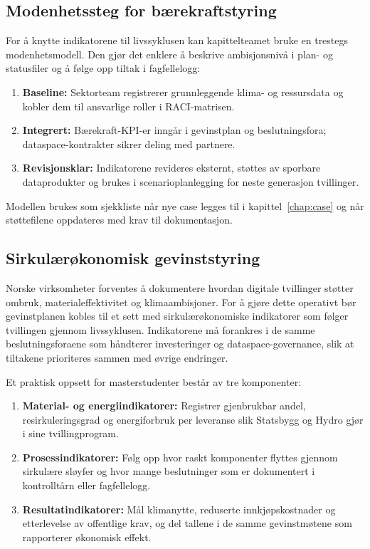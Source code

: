 \subsection*{Modenhetssteg for bærekraftstyring}
For å knytte indikatorene til livssyklusen kan kapittelteamet bruke en trestegs modenhetsmodell. Den gjør det enklere å beskrive ambisjonsnivå i plan- og statusfiler og å følge opp tiltak i fagfellelogg:
\begin{enumerate}
    \item \textbf{Baseline:} Sektorteam registrerer grunnleggende klima- og ressursdata og kobler dem til ansvarlige roller i RACI-matrisen.
    \item \textbf{Integrert:} Bærekraft-KPI-er inngår i gevinstplan og beslutningsfora; dataspace-kontrakter sikrer deling med partnere.
    \item \textbf{Revisjonsklar:} Indikatorene revideres eksternt, støttes av sporbare dataprodukter og brukes i scenarioplanlegging for neste generasjon tvillinger.
\end{enumerate}
Modellen brukes som sjekkliste når nye case legges til i kapittel~\ref{chap:case} og når støttefilene oppdateres med krav til dokumentasjon.

\subsection*{Sirkulærøkonomisk gevinststyring}
Norske virksomheter forventes å dokumentere hvordan digitale tvillinger støtter ombruk, materialeffektivitet og klimaambisjoner.\citep{norskindustri2023sirkular,regjeringen2021sirkulaer} For å gjøre dette operativt bør gevinstplanen kobles til et sett med sirkulærøkonomiske indikatorer som følger tvillingen gjennom livssyklusen. Indikatorene må forankres i de samme beslutningsforaene som håndterer investeringer og dataspace-governance, slik at tiltakene prioriteres sammen med øvrige endringer.

Et praktisk oppsett for masterstudenter består av tre komponenter:
\begin{enumerate}
    \item \textbf{Material- og energiindikatorer:} Registrer gjenbrukbar andel, resirkuleringsgrad og energiforbruk per leveranse slik Statsbygg og Hydro gjør i sine tvillingprogram.\citep{statsbygg2022ombruk,hydro2023traceability}
    \item \textbf{Prosessindikatorer:} Følg opp hvor raskt komponenter flyttes gjennom sirkulære sløyfer og hvor mange beslutninger som er dokumentert i kontrolltårn eller fagfellelogg.
    \item \textbf{Resultatindikatorer:} Mål klimanytte, reduserte innkjøpskostnader og etterlevelse av offentlige krav, og del tallene i de samme gevinstmøtene som rapporterer økonomisk effekt.
\end{enumerate}

